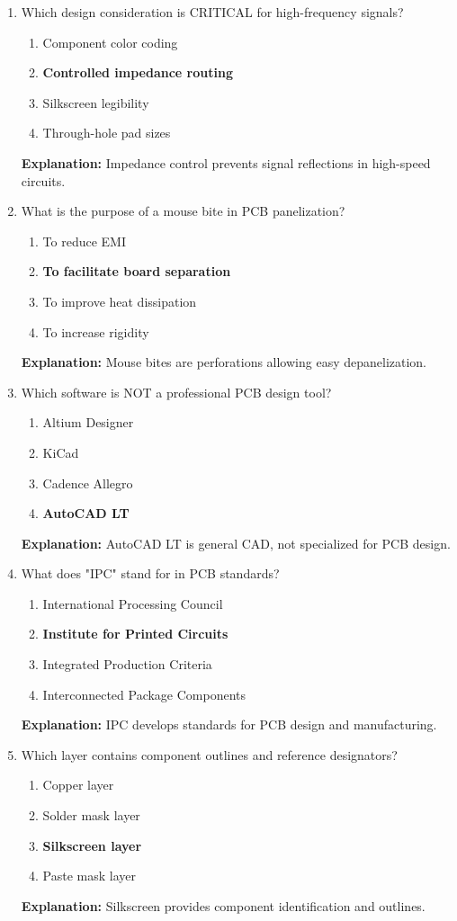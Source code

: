 \documentclass{article}
\begin{document}
\begin{enumerate}[resume]
		\item Which design consideration is CRITICAL for high-frequency signals?
		\begin{enumerate}
			\item Component color coding
			\item \textbf{Controlled impedance routing}
			\item Silkscreen legibility
			\item Through-hole pad sizes
		\end{enumerate}
		\textbf{Explanation:} Impedance control prevents signal reflections in high-speed circuits.
		
		\item What is the purpose of a mouse bite in PCB panelization?
		\begin{enumerate}
			\item To reduce EMI
			\item \textbf{To facilitate board separation}
			\item To improve heat dissipation
			\item To increase rigidity
		\end{enumerate}
		\textbf{Explanation:} Mouse bites are perforations allowing easy depanelization.
		
		\item Which software is NOT a professional PCB design tool?
		\begin{enumerate}
			\item Altium Designer
			\item KiCad
			\item Cadence Allegro
			\item \textbf{AutoCAD LT}
		\end{enumerate}
		\textbf{Explanation:} AutoCAD LT is general CAD, not specialized for PCB design.
		
		\item What does "IPC" stand for in PCB standards?
		\begin{enumerate}
			\item International Processing Council
			\item \textbf{Institute for Printed Circuits}
			\item Integrated Production Criteria
			\item Interconnected Package Components
		\end{enumerate}
		\textbf{Explanation:} IPC develops standards for PCB design and manufacturing.
		
		\item Which layer contains component outlines and reference designators?
		\begin{enumerate}
			\item Copper layer
			\item Solder mask layer
			\item \textbf{Silkscreen layer}
			\item Paste mask layer
		\end{enumerate}
		\textbf{Explanation:} Silkscreen provides component identification and outlines.
		

\end{enumerate}
\end{document}
